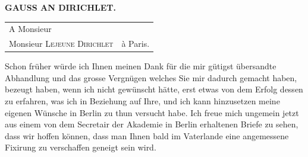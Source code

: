 \clearpage\renewcommand{\BookRunningTitle}{Gauss an Dirichlet.}
\begingroup\fontsize{10.5}{12}\selectfont
{}
\begin{center}\textbf{GAUSS AN DIRICHLET.}\end{center}
\begin{center}
\begin{tabular}{ll}
\hline
A Monsieur&\\
\quad Monsieur \textsc{Lejeune Dirichlet}&\quad à Paris.\\
\hline
\end{tabular}
\end{center}
Schon früher würde ich Ihnen meinen Dank für die mir gütigst übersandte Abhandlung und das grosse Vergnügen welches Sie mir dadurch gemacht haben, bezeugt haben, wenn ich nicht gewünscht hätte, erst etwas von dem Erfolg dessen zu erfahren, was ich in Beziehung auf Ihre, und ich kann hinzusetzen meine eigenen Wünsche in Berlin zu thun versucht habe. Ich freue mich ungemein jetzt aus einem von dem Secretair der Akademie in Berlin erhaltenen Briefe zu sehen, dass wir hoffen können, dass man Ihnen bald im Vaterlande eine angemessene Fixirung zu verschaffen geneigt sein wird.
